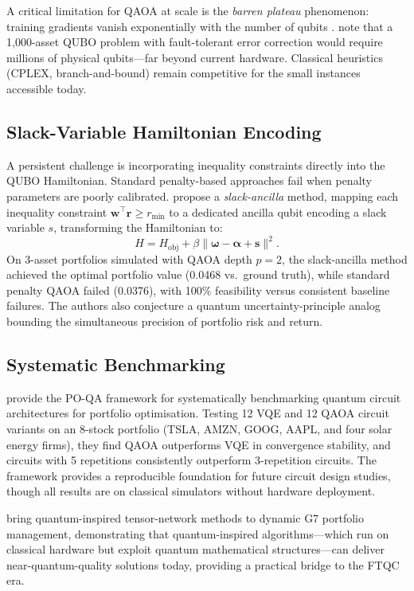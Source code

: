 \documentclass[12pt,a4paper]{article}
\begin{document}
A critical limitation for QAOA at scale is the \emph{barren plateau} phenomenon: training gradients vanish exponentially with the number of qubits \citep{herman_quantum_2023}. \citet{gong_quantum_2026-1} note that a 1{,}000-asset QUBO problem with fault-tolerant error correction would require millions of physical qubits---far beyond current hardware. Classical heuristics (CPLEX, branch-and-bound) remain competitive for the small instances accessible today.

\subsection{Slack-Variable Hamiltonian Encoding}

A persistent challenge is incorporating inequality constraints directly into the QUBO Hamiltonian. Standard penalty-based approaches fail when penalty parameters are poorly calibrated. \citet{thomassin_quantum_2025} propose a \emph{slack-ancilla} method, mapping each inequality constraint $\mathbf{w}^\top \mathbf{r} \geq r_{\min}$ to a dedicated ancilla qubit encoding a slack variable $s$, transforming the Hamiltonian to:
\[
H = H_{\text{obj}} + \beta \|{\boldsymbol{\omega}} - \boldsymbol{\alpha} + \mathbf{s}\|^2.
\]
On 3-asset portfolios simulated with QAOA depth $p=2$, the slack-ancilla method achieved the optimal portfolio value (0.0468 vs.\ ground truth), while standard penalty QAOA failed (0.0376), with 100\% feasibility versus consistent baseline failures. The authors also conjecture a quantum uncertainty-principle analog bounding the simultaneous precision of portfolio risk and return.

\subsection{Systematic Benchmarking}

\citet{zaman_po-qa_2024} provide the PO-QA framework for systematically benchmarking quantum circuit architectures for portfolio optimisation. Testing 12 VQE and 12 QAOA circuit variants on an 8-stock portfolio (TSLA, AMZN, GOOG, AAPL, and four solar energy firms), they find QAOA outperforms VQE in convergence stability, and circuits with 5 repetitions consistently outperform 3-repetition circuits. The framework provides a reproducible foundation for future circuit design studies, though all results are on classical simulators without hardware deployment.

\citet{chou_quantum-inspired_2026} bring quantum-inspired tensor-network methods to dynamic G7 portfolio management, demonstrating that quantum-inspired algorithms---which run on classical hardware but exploit quantum mathematical structures---can deliver near-quantum-quality solutions today, providing a practical bridge to the FTQC era.
\end{document}
